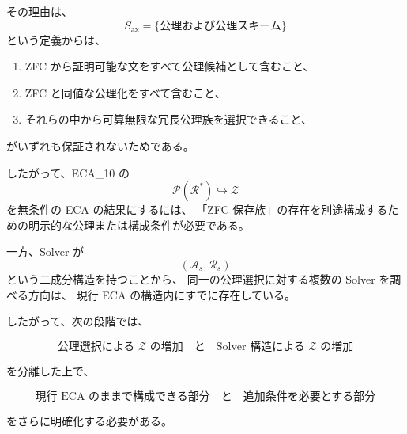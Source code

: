 \documentclass[a4paper,11pt]{jsarticle}
\newcommand{\Ax}{S_{\mathrm{ax}}}
\begin{document}
その理由は、
\[
\Ax
=
\{\text{公理および公理スキーム}\}
\]
という定義からは、

\begin{enumerate}
\item ZFC から証明可能な文をすべて公理候補として含むこと、
\item ZFC と同値な公理化をすべて含むこと、
\item それらの中から可算無限な冗長公理族を選択できること、
\end{enumerate}
がいずれも保証されないためである。

したがって、ECA_10 の
\[
\mathcal{P}(\mathcal{R}^{*})\hookrightarrow\mathcal{Z}
\]
を無条件の ECA の結果にするには、
「ZFC 保存族」の存在を別途構成するための明示的な公理または構成条件が必要である。

一方、Solver が
\[
(\mathcal{A}_s,\mathcal{R}_s)
\]
という二成分構造を持つことから、
同一の公理選択に対する複数の Solver を調べる方向は、
現行 ECA の構造内にすでに存在している。

したがって、次の段階では、

\[
\boxed{
\text{公理選択による $\mathcal{Z}$ の増加}
\quad\text{と}\quad
\text{Solver 構造による $\mathcal{Z}$ の増加}
}
\]

を分離した上で、

\[
\boxed{
\text{現行 ECA のままで構成できる部分}
\quad\text{と}\quad
\text{追加条件を必要とする部分}
}
\]

をさらに明確化する必要がある。
\end{document}
